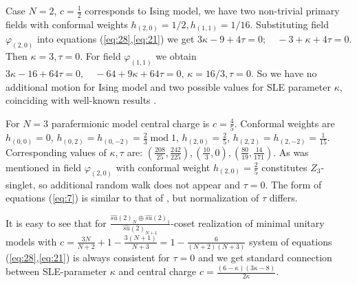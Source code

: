 \documentclass{jetpl}
\begin{document}
Case $N=2$, $c=\frac{1}{2}$ corresponds to Ising model, we have two non-trivial primary fields with conformal weights $h_{(2,0)}=1/2, h_{(1,1)}=1/16$. Substituting field $\varphi_{(2,0)}$ into equations (\ref{eq:28},\ref{eq:21}) we get $3\kappa-9+4\tau =0;\quad -3+\kappa+4\tau=0$. Then $\kappa=3, \tau=0$. For field $\varphi_{(1,1)}$ we obtain $3\kappa-16+64\tau=0,\quad -64+9\kappa + 64\tau=0$, $\kappa=16/3, \tau=0$. So we have no additional motion for Ising model and two possible values for SLE parameter $\kappa$,  coinciding with well-known results \cite{schramm2006conformally}. 

For $N=3$ parafermionic model central charge is $c=\frac{4}{5}$. Conformal weights are $h_{(0,0)}=0$, $h_{(0,2)}=h_{(0,-2)}=\frac{2}{3}\; \mathrm{mod}\; 1$, $h_{(2,0)}=\frac{2}{5}$, $h_{(2,2)}=h_{(2,-2)}=\frac{1}{15}$.  Corresponding values of $\kappa,\tau$ are: $(\frac{208}{25},\frac{242}{225}), (\frac{10}{3},0),(\frac{80}{19},\frac{14}{171})$. As was mentioned in \cite{santachiara2008sle} field $\varphi_{(2,0)}$ with conformal weight $h_{(2,0)}=\frac{2}{5}$ constitutes $Z_{3}$-singlet, so  additional random walk does not appear and $\tau=0$. The form of equations (\ref{eq:7}) is similar to that of \cite{santachiara2008sle}, but normalization of $\tau$ differs. 

It is easy to see that for  $\frac{\hat{su}(2)_{N}\oplus \hat{su}(2)_{1}}{\hat{su}(2)_{N+1}}$-coset realization of minimal unitary models with $c=\frac{3N}{N+2}+1-\frac{3(N+1)}{N+3}=1-\frac{6}{(N+2)(N+3)}$ system of equations (\ref{eq:28},\ref{eq:21}) is always consistent for $\tau=0$ and we get standard connection between SLE-parameter $\kappa$ and central charge $c=\frac{(6-\kappa)(3\kappa-8)}{2\kappa}$. 
\end{document}
